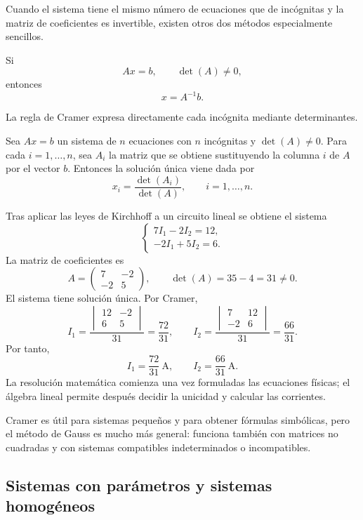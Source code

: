 Cuando el sistema tiene el mismo número de ecuaciones que de incógnitas y la matriz de coeficientes es invertible, existen otros dos métodos especialmente sencillos.

Si
\[
Ax=b,
\qquad \det(A)\neq0,
\]
entonces
\[
\boxed{x=A^{-1}b.}
\]

La regla de Cramer expresa directamente cada incógnita mediante determinantes.

\begin{theorem}
Sea $Ax=b$ un sistema de $n$ ecuaciones con $n$ incógnitas y $\det(A)\neq0$. Para cada $i=1,\ldots,n$, sea $A_i$ la matriz que se obtiene sustituyendo la columna $i$ de $A$ por el vector $b$. Entonces la solución única viene dada por
\[
\boxed{x_i=\frac{\det(A_i)}{\det(A)},\qquad i=1,\ldots,n.}
\]
\end{theorem}

\begin{example}
Tras aplicar las leyes de Kirchhoff a un circuito lineal se obtiene el sistema
\[
\begin{cases}
7I_1-2I_2=12,\\
-2I_1+5I_2=6.
\end{cases}
\]
La matriz de coeficientes es
\[
A=\begin{pmatrix}7&-2\\-2&5\end{pmatrix},
\qquad
\det(A)=35-4=31\neq0.
\]
El sistema tiene solución única. Por Cramer,
\[
I_1=
\frac{\begin{vmatrix}12&-2\\6&5\end{vmatrix}}{31}
=\frac{72}{31},
\qquad
I_2=
\frac{\begin{vmatrix}7&12\\-2&6\end{vmatrix}}{31}
=\frac{66}{31}.
\]
Por tanto,
\[
\boxed{I_1=\frac{72}{31}\ \mathrm A,\qquad I_2=\frac{66}{31}\ \mathrm A.}
\]
La resolución matemática comienza una vez formuladas las ecuaciones físicas; el álgebra lineal permite después decidir la unicidad y calcular las corrientes.
\end{example}

Cramer es útil para sistemas pequeños y para obtener fórmulas simbólicas, pero el método de Gauss es mucho más general: funciona también con matrices no cuadradas y con sistemas compatibles indeterminados o incompatibles.

\subsection{Sistemas con parámetros y sistemas homogéneos}

